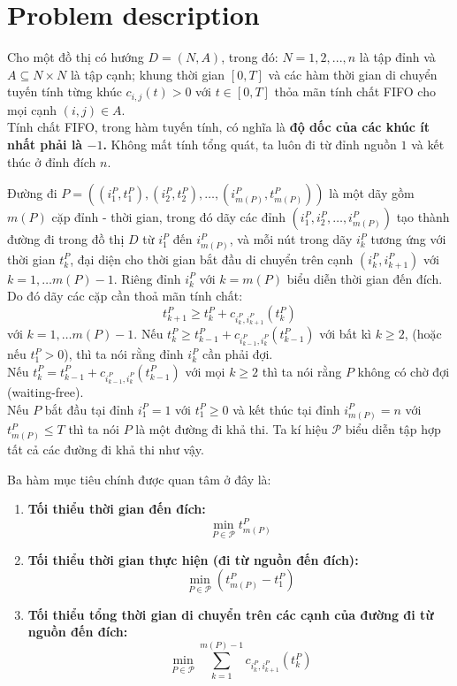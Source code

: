 \documentclass[../main.tex]{subfiles}
\begin{document}
\frontmatter
\pagestyle{empty}
\mainmatter
\pagestyle{fancy}
\chapter{Problem description}\label{problem-description}

Cho một đồ thị có hướng \(D = (N, A)\), trong đó: \(N = {1, 2, ..., n}\)
là tập đỉnh và \(A \subseteq N \times N\) là tập cạnh; khung thời gian
\([0, T]\) và các hàm thời gian di chuyển tuyến tính từng khúc
\(c_{i,j}(t) > 0\) với \(t \in [0, T]\) thỏa mãn tính chất FIFO cho mọi
cạnh \((i, j) \in A\).\\
Tính chất FIFO, trong hàm tuyến tính, có nghĩa là
\textbf{độ dốc của các khúc ít nhất phải là \(-1\).} Không mất tính tổng
quát, ta luôn đi từ đỉnh nguồn \(1\) và kết thúc ở đỉnh đích
\(n\).

Đường đi
\(P=((i_1^P, t_1^P), (i_2^P, t_2^P), \dots, (i_{m(P)}^P, t_{m(P)}^P))\)
là một dãy gồm \(m(P)\) cặp đỉnh - thời gian, trong đó dãy các đỉnh
\((i_1^P, i_2^P, \dots, i_{m(P)}^P)\) tạo thành đường đi trong đồ thị
\(D\) từ \(i_1^P\) đến \(i_{m(P)}^P\), và mỗi nút trong dãy \(i_k^P\)
tương ứng với thời gian \(t_k^P\), đại diện cho thời gian bắt đầu di
chuyển trên cạnh \((i_k^P, i_{k+1}^P)\) với \(k=1, \dots m(P)-1\). Riêng
đỉnh \(i_k^P\) với \(k=m(P)\) biểu diễn thời gian đến đích. Do đó dãy
các cặp cần thoả mãn tính chất:
\[t_{k+1}^P \ge t_k^P + c_{i_k^P, i_{k+1}^P}(t_k^P)\] với
\(k=1, \dots m(P)-1\). Nếu
\(t_{k}^P \ge t_{k-1}^P + c_{i_{k-1}^P, i_{k}^P}(t_{k-1}^P)\) với bất kì
\(k \ge 2\), (hoặc nếu \(t_1^P > 0\)), thì ta nói rằng đỉnh \(i_k^P\)
cần phải đợi.\\ 
Nếu \(t_{k}^P = t_{k-1}^P + c_{i_{k-1}^P, i_{k}^P}(t_{k-1}^P)\) với mọi
\(k \ge 2\) thì ta nói rằng \(P\) không có chờ đợi (waiting-free). \\
Nếu \(P\) bắt đầu tại đỉnh \(i_1^P = 1\) với \(t_1^P\ge0\) và kết thúc tại
đỉnh \(i_{m(P)}^P=n\) với \(t_{m(P)}^P \le T\) thì ta nói \(P\) là một
đường đi khả thi. Ta kí hiệu \(\mathcal{P}\) biểu diễn tập hợp tất cả các
đường đi khả thi như vậy.

Ba hàm mục tiêu chính được quan tâm ở đây là:

\begin{enumerate}
\def\labelenumi{\arabic{enumi}.}
\tightlist
\item
  \textbf{Tối thiểu thời gian đến đích:}
  \[\min_{P\in \mathcal P}t_{m(P)}^P\]
\item
  \textbf{Tối thiểu thời gian thực hiện (đi từ nguồn đến đích):}
  \[\min_{P\in \mathcal P}(t_{m(P)}^P-t_1^P)\]
\item
  \textbf{Tối thiểu tổng thời gian di chuyển trên các cạnh của đường đi
  từ nguồn đến đích:}
  \[\min_{P\in \mathcal P}\sum_{k=1}^{m(P)-1}c_{i_k^P, i_{k+1}^P}(t_k^P)\]
\end{enumerate}
\end{document}
